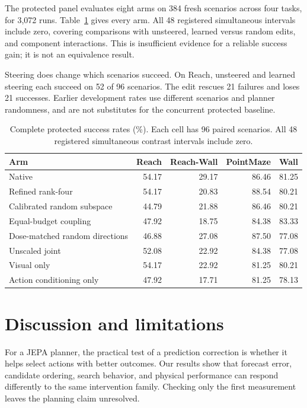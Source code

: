 \documentclass{article}
\begin{document}
The protected panel evaluates eight arms on 384 fresh scenarios across four tasks, for 3,072 runs. Table~\ref{tab:main-rates} gives every arm. All 48 registered simultaneous intervals include zero, covering comparisons with unsteered, learned versus random edits, and component interactions. This is insufficient evidence for a reliable success gain; it is not an equivalence result.

Steering does change which scenarios succeed. On Reach, unsteered and learned steering each succeed on 52 of 96 scenarios. The edit rescues 21 failures and loses 21 successes. Earlier development rates use different scenarios and planner randomness, and are not substitutes for the concurrent protected baseline.

\begin{table}[t]
\centering\small
\caption{Complete protected success rates (\%). Each cell has 96 paired scenarios. All 48 registered simultaneous contrast intervals include zero.}
\label{tab:main-rates}
\setlength{\tabcolsep}{4pt}
\begin{tabular}{@{}lrrrr@{}}
\toprule
Arm & Reach & Reach-Wall & PointMaze & Wall\\
\midrule
Native & 54.17 & 29.17 & 86.46 & 81.25\\
Refined rank-four & 54.17 & 20.83 & 88.54 & 80.21\\
Calibrated random subspace & 44.79 & 21.88 & 86.46 & 80.21\\
Equal-budget coupling & 47.92 & 18.75 & 84.38 & 83.33\\
Dose-matched random directions & 46.88 & 27.08 & 87.50 & 77.08\\
Unscaled joint & 52.08 & 22.92 & 84.38 & 77.08\\
Visual only & 54.17 & 22.92 & 81.25 & 80.21\\
Action conditioning only & 47.92 & 17.71 & 81.25 & 78.13\\
\bottomrule
\end{tabular}
\end{table}

\section{Discussion and limitations}

For a JEPA planner, the practical test of a prediction correction is whether it helps select actions with better outcomes. Our results show that forecast error, candidate ordering, search behavior, and physical performance can respond differently to the same intervention family. Checking only the first measurement leaves the planning claim unresolved.
\end{document}
